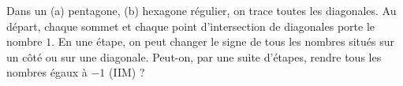 Dans un (a) pentagone, (b) hexagone régulier, on trace toutes les diagonales. Au départ, chaque sommet et chaque point d'intersection de diagonales porte le nombre $1$. En une étape, on peut changer le signe de tous les nombres situés sur un côté ou sur une diagonale. Peut-on, par une suite d'étapes, rendre tous les nombres égaux à $-1$ (IIM) ?
